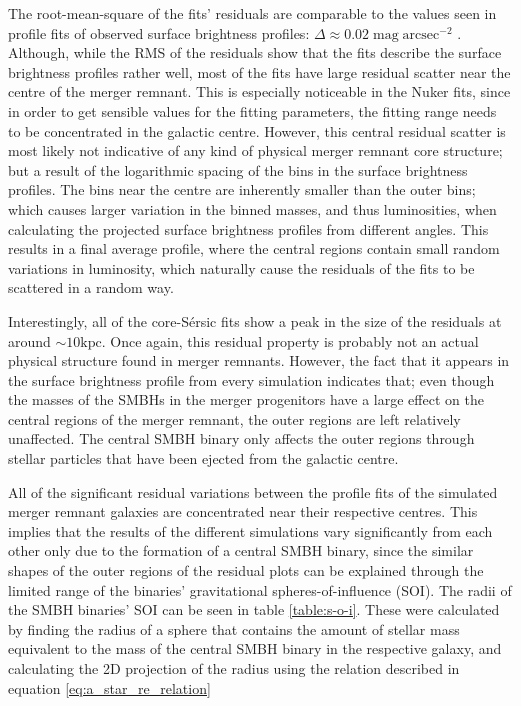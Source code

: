 \documentclass[english, oneside]{HYgradu}
\begin{document}
The root-mean-square of the fits' residuals are comparable to the values seen in profile fits of observed surface brightness profiles: $\Delta \approx 0.02 \; \mathrm{mag \; arcsec^{-2}}$ \citep{Dullo2012}. Although, while the RMS of the residuals show that the fits describe the surface brightness profiles rather well, most of the fits have large residual scatter near the centre of the merger remnant. This is especially noticeable in the Nuker fits, since in order to get sensible values for the fitting parameters, the fitting range needs to be concentrated in the galactic centre. However, this central residual scatter is most likely not indicative of any kind of physical merger remnant core structure; but a result of the logarithmic spacing of the bins in the surface brightness profiles. The bins near the centre are inherently smaller than the outer bins; which causes larger variation in the binned masses, and thus luminosities, when calculating the projected surface brightness profiles from different angles. This results in a final average profile, where the central regions contain small random variations in luminosity, which naturally cause the residuals of the fits to be scattered in a random way.

Interestingly, all of the core-Sérsic fits show a peak in the size of the residuals at around $\sim 10 \mathrm{kpc}$. Once again, this residual property is probably not an actual physical structure found in merger remnants. However, the fact that it appears in the surface brightness profile from every simulation indicates that; even though the masses of the SMBHs in the merger progenitors have a large effect on the central regions of the merger remnant, the outer regions are left relatively unaffected. The central SMBH binary only affects the outer regions through stellar particles that have been ejected from the galactic centre. 

All of the significant residual variations between the profile fits of the simulated merger remnant galaxies are concentrated near their respective centres. This implies that the results of the different simulations vary significantly from each other only due to the formation of a central SMBH binary, since the similar shapes of the outer regions of the residual plots can be explained through the limited range of the binaries' gravitational spheres-of-influence (SOI). The radii of the SMBH binaries' SOI can be seen in table \ref{table:s-o-i}. These were calculated by finding the radius of a sphere that contains the amount of stellar mass equivalent to the mass of the central SMBH binary in the respective galaxy, and calculating the 2D projection of the radius using the relation described in equation \ref{eq:a_star_re_relation}
\end{document}
